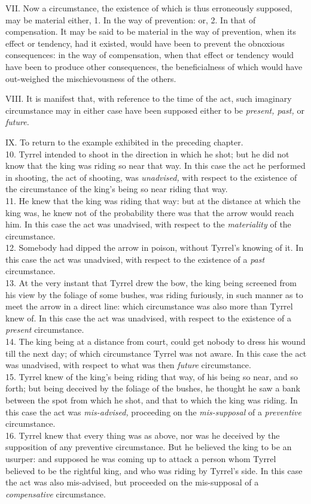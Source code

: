 \documentclass[12pt]{report}
\begin{document}
VII. Now a circumstance, the existence of which is thus erroneously
supposed, may be material either, 1. In the way of prevention: or, 2. In
that of compensation. It may be said to be material in the way of
prevention, when its effect or tendency, had it existed, would have been
to prevent the obnoxious consequences: in the way of compensation, when
that effect or tendency would have been to produce other consequences,
the beneficialness of which would have out-weighed the mischievousness
of the others.

VIII. It is manifest that, with reference to the time of the act, such
imaginary circumstance may in either case have been supposed either to
be \emph{present, past,} or \emph{future.} \emph{}

IX. To return to the example exhibited in the preceding chapter.\\
10. Tyrrel intended to shoot in the direction in which he shot; but he
did not know that the king was riding so near that way. In this case the
act he performed in shooting, the act of shooting, was \emph{unadvised,}
with respect to the existence of the circumstance of the king's being so
near riding that way.\\
11. He knew that the king was riding that way: but at the distance at
which the king was, he knew not of the probability there was that the
arrow would reach him. In this case the act was unadvised, with respect
to the \emph{materiality} of the circumstance.\\
12. Somebody had dipped the arrow in poison, without Tyrrel's knowing of
it. In this case the act was unadvised, with respect to the existence of
a \emph{past} circumstance.\\
13. At the very instant that Tyrrel drew the bow, the king being
screened from his view by the foliage of some bushes, was riding
furiously, in such manner as to meet the arrow in a direct line: which
circumstance was also more than Tyrrel knew of. In this case the act was
unadvised, with respect to the existence of a \emph{present}
circumstance.\\
14. The king being at a distance from court, could get nobody to dress
his wound till the next day; of which circumstance Tyrrel was not aware.
In this case the act was unadvised, with respect to what was then
\emph{future} circumstance.\\
15. Tyrrel knew of the king's being riding that way, of his being so
near, and so forth; but being deceived by the foliage of the bushes, he
thought he saw a bank between the spot from which he shot, and that to
which the king was riding. In this case the act was \emph{mis-advised,}
proceeding on the \emph{mis-supposal} of a \emph{preventive}
circumstance.\\
16. Tyrrel knew that every thing was as above, nor was he deceived by
the supposition of any preventive circumstance. But he believed the king
to be an usurper: and supposed he was coming up to attack a person whom
Tyrrel believed to be the rightful king, and who was riding by Tyrrel's
side. In this case the act was also mis-advised, but proceeded on the
mis-supposal of a \emph{compensative} circumstance.
\end{document}
